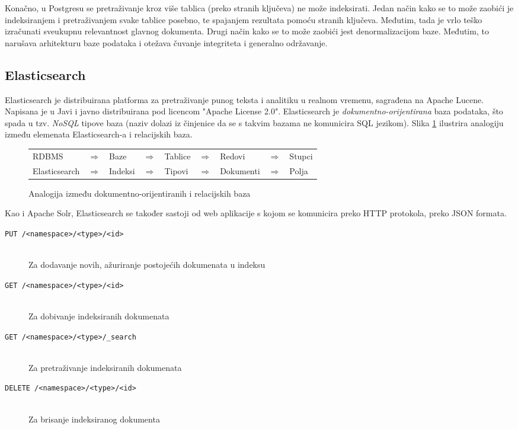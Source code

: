 \documentclass[a4paper,twoside,12pt]{scrreprt}
\begin{document}
Konačno, u Postgresu se pretraživanje kroz više tablica (preko stranih ključeva) ne može indeksirati. Jedan način kako se to može zaobići je indeksiranjem i pretraživanjem svake tablice posebno, te spajanjem rezultata pomoću stranih ključeva. Međutim, tada je vrlo teško izračunati sveukupnu relevantnost glavnog dokumenta. Drugi način kako se to može zaobići jest denormalizacijom baze. Međutim, to narušava arhitekturu baze podataka i otežava čuvanje integriteta i generalno održavanje.

\subsection{Elasticsearch}

Elasticsearch je distribuirana platforma za pretraživanje punog teksta i analitiku u realnom vremenu, sagrađena na Apache Lucene. Napisana je u Javi i javno distribuirana pod licencom "Apache License 2.0". Elasticsearch je \textit{dokumentno-orijentirana} baza podataka, što spada u tzv. \textit{NoSQL} tipove baza (naziv dolazi iz činjenice da se s takvim bazama ne komunicira SQL jezikom). Slika \ref{elasticsearch} ilustrira analogiju između elemenata Elasticsearch-a i relacijskih baza.

\begin{figure}[H]
  \centering
  \begin{tabular}{lllllllll}
    RDBMS         & $\Rightarrow$ & Baze    & $\Rightarrow$ & Tablice & $\Rightarrow$ & Redovi    & $\Rightarrow$ & Stupci \\
    Elasticsearch & $\Rightarrow$ & Indeksi & $\Rightarrow$ & Tipovi  & $\Rightarrow$ & Dokumenti & $\Rightarrow$ & Polja  \\
  \end{tabular}
  \caption{Analogija između dokumentno-orijentiranih i relacijskih baza}
  \label{elasticsearch}
\end{figure}

Kao i Apache Solr, Elasticsearch se također sastoji od web aplikacije s kojom se komunicira preko HTTP protokola, preko JSON formata.

\begin{description}
  \item[\texttt{PUT /<namespace>/<type>/<id>}] \hfill \\ Za dodavanje novih, ažuriranje postojećih dokumenata u indeksu
  \item[\texttt{GET /<namespace>/<type>/<id>}] \hfill \\ Za dobivanje indeksiranih dokumenata
  \item[\texttt{GET /<namespace>/<type>/\_search}] \hfill \\ Za pretraživanje indeksiranih dokumenata
  \item[\texttt{DELETE /<namespace>/<type>/<id>}] \hfill \\ Za brisanje indeksiranog dokumenta
\end{description}
\end{document}

